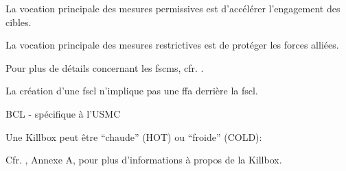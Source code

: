 \begin{e1}
	
	\item La vocation principale des mesures permissives est d'accélérer l'engagement des cibles.
	
	\item La vocation principale des mesures restrictives est de protéger les forces alliées.
	
	\item Pour plus de détails concernant les \glspl{fscm}, cfr. .
	
	
	\begin{e2}
		
		 {}
		
		 {}
		
		
		La création d'une \gls{fscl} n'implique pas une \gls{ffa} derrière la \gls{fscl}.
		
		\item BCL - spécifique à l'USMC
		
		 {}
		
		 {}
		
		
		
		 {Une Killbox peut être ``chaude'' (HOT) ou ``froide'' (COLD):}
		
		\begin{e3}
			
			
			
		\end{e3}
		
		Cfr. , Annexe A, pour plus d'informations à propos de la Killbox.
		
	\end{e2}
	
	

\end{e1}
